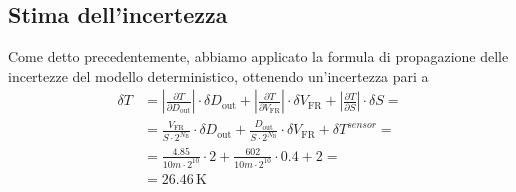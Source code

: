 \documentclass[a4paper]{article}
\newcommand\abs[1]{\left|#1\right|}
\begin{document}
		\subsection{Stima dell'incertezza}
			Come detto precedentemente, abbiamo applicato la formula di propagazione delle incertezze del modello deterministico, ottenendo un'incertezza pari a
			\begin{equation*}
				\begin{split}
					\delta T &= \abs{\frac{\partial T}{\partial D_{\mathrm{out}}}} \cdot \delta D_{\mathrm{out}} + \abs{\frac{\partial T}{\partial V_{\mathrm{FR}}}} \cdot \delta V_{\mathrm{FR}} + \abs{\frac{\partial T}{\partial S}} \cdot \delta S = \\
							 &= \frac{V_{\mathrm{FR}}}{S \cdot 2^{N_{\mathrm{B}}}} \cdot \delta D_{\mathrm{out}} + \frac{D_{\mathrm{out}}}{S \cdot 2^{N_{\mathrm{B}}}} \cdot \delta V_{\mathrm{FR}} + \delta T^{sensor} = \\
							 &= \frac{4.85}{10m \cdot 2^{10}} \cdot 2 + \frac{602}{10m \cdot 2^{10}} \cdot 0.4 + 2 = \\
							 &= 26.46 \, \mathrm{K}
				\end{split}
			\end{equation*}
\end{document}
